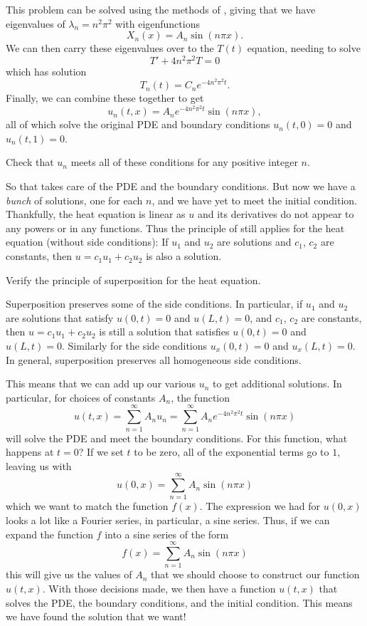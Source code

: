 This problem can be solved using the methods of , giving that we have eigenvalues of $\lambda_n = n^2\pi^2$ with eigenfunctions \[X_n(x) = A_n \sin(n\pi x). \] We can then carry these eigenvalues over to the $T(t)$ equation, needing to solve
\[ T' + 4n^2\pi^2 T = 0 \] which has solution 
\[ T_n(t) = C_n e^{-4n^2\pi^2 t}. \] Finally, we can combine these together to get
\[ u_n(t,x) = A_n e^{-4n^2\pi^2 t}\sin(n\pi x), \] all of which solve the original PDE and boundary conditions $u_n(t, 0) = 0$ and $u_n(t,1) = 0$. 

\begin{exercise}
Check that $u_n$ meets all of these conditions for any positive integer $n$. 
\end{exercise}

So that takes care of the PDE and the boundary conditions. But now we have a \emph{bunch} of solutions, one for each $n$, and we have yet to meet the initial condition. Thankfully, the heat equation is linear as $u$ and its derivatives do not
appear to any powers or in any functions.
Thus the principle of  still applies for
the heat equation
(without side conditions):
If $u_1$ and $u_2$ are
solutions and $c_1$, $c_2$ are constants, then
$u = c_1 u_1 + c_2 u_2$ is also a solution.

\begin{exercise}
Verify the principle of superposition for the heat equation.
\end{exercise}

Superposition preserves some of the side conditions.  In particular,
if $u_1$ and $u_2$ are
solutions that satisfy $u(0,t) = 0$ and $u(L,t) = 0$,
and $c_1$, $c_2$ are constants, then
$u = c_1 u_1 + c_2 u_2$ is still a solution
that satisfies $u(0,t) = 0$ and $u(L,t) = 0$.  Similarly
for the side conditions $u_x(0,t) = 0$ and $u_x(L,t) = 0$.  In general,
superposition preserves all homogeneous side conditions.

This means that we can add up our various $u_n$ to get additional solutions. In particular, for choices of constants $A_n$, the function
\[ u(t,x) = \sum_{n=1}^\infty A_n u_n = \sum_{n=1}^\infty A_n e^{-4n^2\pi^2 t}\sin(n\pi x) \] will solve the PDE and meet the boundary conditions. For this function, what happens at $t=0$? If we set $t$ to be zero, all of the exponential terms go to $1$, leaving us with
\[ u(0, x) =  \sum_{n=1}^\infty A_n \sin(n\pi x) \] which we want to match the function $f(x)$. The expression we had for $u(0,x)$ looks a lot like a Fourier series, in particular, a sine series. Thus, if we can expand the function $f$ into a sine series of the form \[ f(x) = \sum_{n=1}^\infty A_n \sin(n\pi x) \] this will give us the values of $A_n$ that we should choose to construct our function $u(t,x)$. With those decisions made, we then have a function $u(t,x)$ that solves the PDE, the boundary conditions, and the initial condition. This means we have found the solution that we want!


